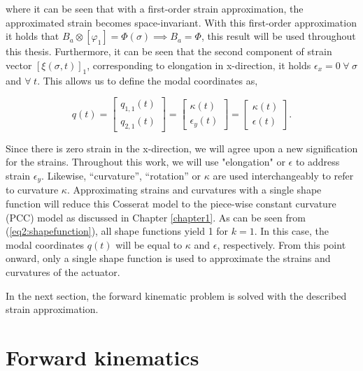 where it can be seen that with a first-order strain approximation, the approximated strain becomes space-invariant. With this first-order approximation it holds that $B_a \otimes [\varphi_1] = \Phi(\sigma) \implies B_a = \Phi$, this result will be used throughout this thesis. Furthermore, it can be seen that the second component of strain vector $[\xi(\sigma,t)]_1$, corresponding to elongation in x-direction, it holds $\epsilon_x = 0 \hspace{3pt} \forall \hspace{3pt} \sigma $ and $ \forall \hspace{3pt} t$. This allows us to define the modal coordinates as,


\begin{equation}
q(t) = \begin{bmatrix} q_{1,1}(t) \\ q_{2,1}(t) \end{bmatrix} = \begin{bmatrix} \kappa(t) \\ \epsilon_y(t) \end{bmatrix} = \begin{bmatrix} \kappa(t) \\ \epsilon(t) \end{bmatrix}.
\end{equation}

Since there is zero strain in the x-direction, we will agree upon a new signification for the strains. Throughout this work, we will use "elongation" or $\epsilon$ to address strain $\epsilon_y$. Likewise, ``curvature'', ``rotation'' or  $\kappa$ are used interchangeably to refer to curvature $\kappa$. Approximating strains and curvatures with a single shape function will reduce this Cosserat model to the piece-wise constant curvature (PCC) model as discussed in Chapter \ref{chapter1}. As can be seen from (\ref{eq2:shapefunction}), all shape functions yield 1 for $k=1$. In this case, the modal coordinates $q(t)$ will be equal to $\kappa$ and $\epsilon$, respectively. From this point onward, only a single shape function is used to approximate the strains and curvatures of the actuator. 

In the next section, the forward kinematic problem is solved with the described strain approximation.




\section{Forward kinematics}

